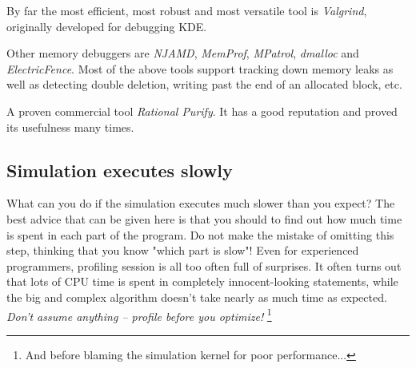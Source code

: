 By far the most efficient, most robust and most versatile tool
is \textit{Valgrind}, originally developed for debugging KDE.

Other memory debuggers are \textit{NJAMD}, \textit{MemProf},
\textit{MPatrol}, \textit{dmalloc} and \textit{ElectricFence}.
Most of the above tools support tracking down memory leaks as well as
detecting double deletion, writing past the end of an allocated block, etc.

A proven commercial tool \textit{Rational Purify}. It has
a good reputation and proved its usefulness many times.



%
%
%
%


\subsection{Simulation executes slowly}

What can you do if the simulation executes much slower than you expect?
The best advice that can be given here is that you should
 to find out how much time is spent in each
part of the program. Do not make the mistake of omitting this step,
thinking that you know "which part is slow"! Even for experienced
programmers, profiling session is all too often full of surprises.
It often turns out that lots of CPU time is spent in completely
innocent-looking statements, while the big and complex algorithm
doesn't take nearly as much time as expected. \textit{Don't assume anything
-- profile before you optimize!}
    \footnote{And before blaming the simulation kernel for poor performance...}

